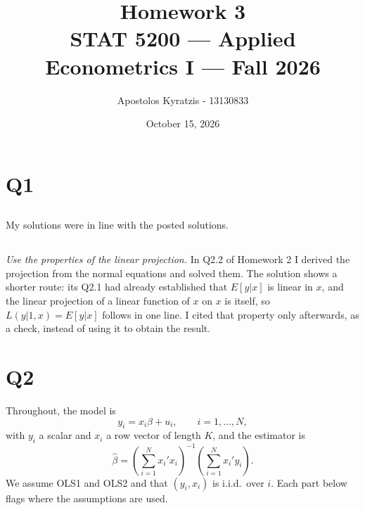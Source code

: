 \documentclass[11pt]{article}
\title{\vspace{-2em}Homework 3\\[0.3em]
       \large STAT 5200 --- Applied Econometrics I --- Fall 2026}
\author{Apostolos Kyratzis - 13130833}
\date{October 15, 2026}
\begin{document}
\maketitle

\section{Q1}
\label{sec:q1}

\subsection{}
My solutions were in line with the posted solutions.

\subsection{}

\emph{Use the properties of the linear projection.} In Q2.2 of Homework 2 I
derived the projection from the normal equations and solved them. The solution
shows a shorter route: its Q2.1 had already established that $E[y|x]$ is linear
in $x$, and
the linear projection of a linear function of $x$ on $x$ is itself, so
$L(y|1,x) = E[y|x]$ follows in one line. I cited that property only afterwards,
as a check, instead of using it to obtain the result.

\clearpage
\section{Q2}
\label{sec:q2}

Throughout, the model is
\[
y_i = x_i\beta + u_i, \qquad i = 1,\dots,N,
\]
with $y_i$ a scalar and $x_i$ a row vector of length $K$, and the estimator is
\[
\hat\beta = \left(\sum_{i=1}^{N} x_i'x_i\right)^{-1}
            \left(\sum_{i=1}^{N} x_i'y_i\right).
\]
We assume OLS1 and OLS2 and that $(y_i,x_i)$ is i.i.d.\ over $i$. Each part
below flags where the assumptions are used.
\end{document}
